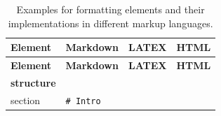 \documentclass[10pt,fleqn]{wlpeerj}
\begin{document}
\begin{longtable}[c]{@{}llll@{}}
\caption{Examples for formatting elements and their implementations in
different markup languages.}\tabularnewline
\toprule
\begin{minipage}[b]{0.11\columnwidth}\raggedright\strut
\textbf{Element}
\strut\end{minipage} &
\begin{minipage}[b]{0.17\columnwidth}\raggedright\strut
\textbf{Markdown}
\strut\end{minipage} &
\begin{minipage}[b]{0.33\columnwidth}\raggedright\strut
\textbf{LATEX}
\strut\end{minipage} &
\begin{minipage}[b]{0.27\columnwidth}\raggedright\strut
\textbf{HTML}
\strut\end{minipage}\tabularnewline
\midrule
\endfirsthead
\toprule
\begin{minipage}[b]{0.11\columnwidth}\raggedright\strut
\textbf{Element}
\strut\end{minipage} &
\begin{minipage}[b]{0.17\columnwidth}\raggedright\strut
\textbf{Markdown}
\strut\end{minipage} &
\begin{minipage}[b]{0.33\columnwidth}\raggedright\strut
\textbf{LATEX}
\strut\end{minipage} &
\begin{minipage}[b]{0.27\columnwidth}\raggedright\strut
\textbf{HTML}
\strut\end{minipage}\tabularnewline
\midrule
\endhead
\begin{minipage}[t]{0.11\columnwidth}\raggedright\strut
\textbf{structure}
\strut\end{minipage} &
\begin{minipage}[t]{0.17\columnwidth}\raggedright\strut
\strut\end{minipage} &
\begin{minipage}[t]{0.33\columnwidth}\raggedright\strut
\strut\end{minipage}\tabularnewline
\begin{minipage}[t]{0.11\columnwidth}\raggedright\strut
section
\strut\end{minipage} &
\begin{minipage}[t]{0.17\columnwidth}\raggedright\strut
\texttt{\#\ Intro}
\strut\end{minipage} &
\begin{minipage}[t]{0.33\columnwidth}\raggedright\strut

\end{minipage}
\end{longtable}
\end{document}
